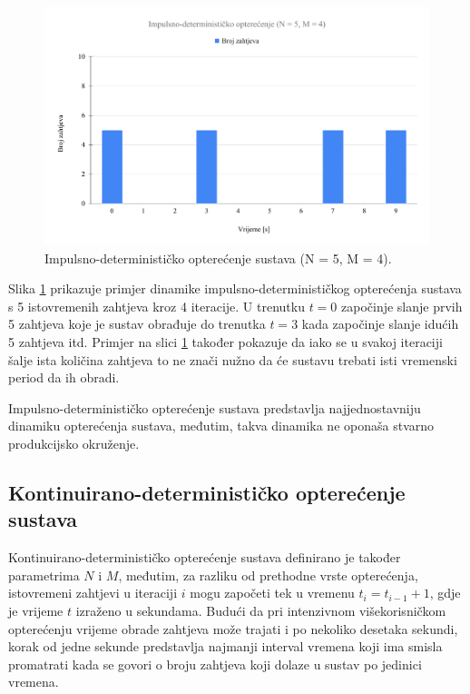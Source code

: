 \documentclass[times, utf8, diplomski]{fer}
\begin{document}
\begin{figure}[htb]
	\centering
	\includegraphics[width=\textwidth]{images/Impulsno-determinističko opterećenje (N = 5, M = 4).pdf}
	\caption{
		Impulsno-determinističko opterećenje sustava (N = 5, M = 4).
	}
	\label{fig:id-load}
\end{figure}

Slika \ref{fig:id-load} prikazuje primjer dinamike impulsno-determinističkog opterećenja sustava s 5 istovremenih zahtjeva kroz 4 iteracije. U trenutku $t=0$ započinje slanje prvih 5 zahtjeva koje je sustav obrađuje do trenutka $t=3$ kada započinje slanje idućih 5 zahtjeva itd. Primjer na slici \ref{fig:id-load} također pokazuje da iako se u svakoj iteraciji šalje ista količina zahtjeva to ne znači nužno da će sustavu trebati isti vremenski period da ih obradi.

Impulsno-determinističko opterećenje sustava predstavlja najjednostavniju dinamiku opterećenja sustava, međutim, takva dinamika ne oponaša stvarno produkcijsko okruženje.

\subsection{Kontinuirano-determinističko opterećenje sustava}
\label{subsec:cd-load}
Kontinuirano-determinističko opterećenje sustava definirano je također parametrima $N$ i $M$, međutim, za razliku od prethodne vrste opterećenja, istovremeni zahtjevi u iteraciji $i$ mogu započeti tek u vremenu $t_i = t_{i - 1} + 1$, gdje je vrijeme $t$ izraženo u sekundama. Budući da pri intenzivnom višekorisničkom opterećenju vrijeme obrade zahtjeva može trajati i po nekoliko desetaka sekundi, korak od jedne sekunde predstavlja najmanji interval vremena koji ima smisla promatrati kada se govori o broju zahtjeva koji dolaze u sustav po jedinici vremena.
\end{document}
